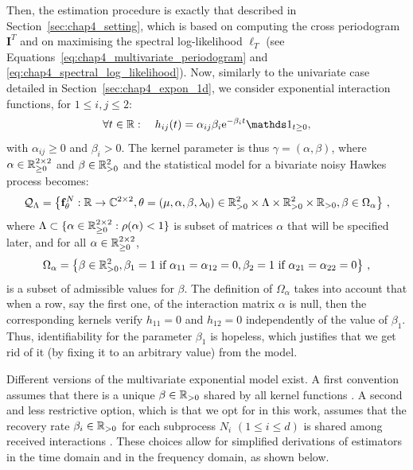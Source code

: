       Then, the estimation procedure is exactly that described in Section~\ref{sec:chap4_setting},
      which is based on computing the cross periodogram $\mathbf I^T$ and on maximising the spectral log-likelihood $\ell_T$ (see Equations~\eqref{eq:chap4_multivariate_periodogram} and \eqref{eq:chap4_spectral_log_likelihood}).
      Now, similarly to the univariate case detailed in Section~\ref{sec:chap4_expon_1d}, we consider exponential interaction functions, \ie for $1 \le i, j \le 2$:
      \[
        \forall t \in \RR: \quad
        h_{ij}(t) = \alpha_{ij} \beta_i \mathrm e^{-\beta_i t} \II_{t \ge 0},
      \]
      with $\alpha_{ij} \ge 0$ and $\beta_i > 0$.
      The kernel parameter is thus $\gamma = (\alpha, \beta)$, where $\alpha \in {\mathbb R}_{\ge 0}^{2 \times 2}$ and $\beta \in {\mathbb R}_{>0}^2$ and the statistical model for a bivariate noisy Hawkes process becomes:
      \[
        \mathcal Q_\Lambda =
        \left\{
          \mathbf{f}_{\theta}^N : {\mathbb R} \to \mathbb C^{2 \times 2},
          \theta = (\mu, \alpha, \beta, \lambda_0)
          \in {\mathbb R}_{>0}^2\times \Lambda \times {\mathbb R}_{>0}^2 \times {\mathbb R}_{>0},
          \beta \in \Omega_\alpha
        \right\}\,,
      \]
      where $\Lambda \subset \{\alpha \in {\mathbb R}_{\geq 0}^{2\times 2} : \rho(\alpha) < 1\}$ is subset of matrices $\alpha$ that will be specified later,
      and for all $\alpha \in {\mathbb R}_{\geq 0}^{2\times 2}$,
      \[
        \Omega_\alpha =
        \left\{
          \beta \in {\mathbb R}_{>0}^2,
          \beta_1 = 1 \text{ if } \alpha_{11} = \alpha_{12} = 0,
          \beta_2 = 1 \text{ if } \alpha_{21} = \alpha_{22} = 0
        \right\} \,,
      \]
      is a subset of admissible values for $\beta$.
      The definition of $\Omega_\alpha$
      takes into account that when a row, say the first one, of the interaction matrix $\alpha$ is null, then the corresponding kernels verify $h_{11}=0$ and $h_{12}=0$ independently of the value of $\beta_1$.
      Thus, identifiability for the parameter $\beta_1$ is hopeless, which justifies that we get rid of it (by fixing it to an arbitrary value) from the model.
      
      \begin{remark}
        Different versions of the multivariate exponential model exist. A first convention assumes that there is a unique $\beta\in{\mathbb R}_{>0}$ shared by all kernel functions \parencite{Chevallier2019, Bacry2020}. A second and less restrictive option, which is that we opt for in this work, assumes that the recovery rate $\beta_i\in{\mathbb R}_{>0}$ for each subprocess $N_i$ $(1 \le i \le d)$ is shared among received interactions \parencite{Bonnet2023}. These choices allow for simplified derivations of estimators in the time domain and in the frequency domain, as shown below.  
      \end{remark}
      
